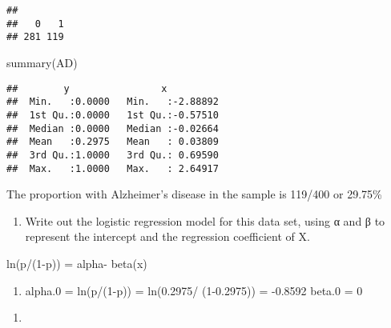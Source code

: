 \documentclass[
]{article}
\newenvironment{Shaded}{\begin{snugshade}}{\end{snugshade}}
\newcommand{\FunctionTok}[1]{\textcolor[rgb]{0.00,0.00,0.00}{#1}}
\newcommand{\NormalTok}[1]{#1}
\providecommand{\tightlist}{%
  \setlength{\itemsep}{0pt}\setlength{\parskip}{0pt}}
\begin{document}
\begin{verbatim}
## 
##   0   1 
## 281 119
\end{verbatim}

\begin{Shaded}
\begin{Highlighting}[]
\FunctionTok{summary}\NormalTok{(AD)}
\end{Highlighting}
\end{Shaded}

\begin{verbatim}
##        y                x           
##  Min.   :0.0000   Min.   :-2.88892  
##  1st Qu.:0.0000   1st Qu.:-0.57510  
##  Median :0.0000   Median :-0.02664  
##  Mean   :0.2975   Mean   : 0.03809  
##  3rd Qu.:1.0000   3rd Qu.: 0.69590  
##  Max.   :1.0000   Max.   : 2.64917
\end{verbatim}

The proportion with Alzheimer's disease in the sample is 119/400 or
29.75\%

\begin{enumerate}
\def\labelenumi{\alph{enumi}.}
\setcounter{enumi}{1}
\tightlist
\item
  Write out the logistic regression model for this data set, using α and
  β to represent the intercept and the regression coefficient of X.
\end{enumerate}

ln(p/(1-p)) = alpha- beta(x)

\begin{enumerate}
\def\labelenumi{\alph{enumi}.}
\setcounter{enumi}{2}
\tightlist
\item
  alpha.0 = ln(p/(1-p)) = ln(0.2975/ (1-0.2975)) = -0.8592 beta.0 = 0
\end{enumerate}

\begin{enumerate}
\def\labelenumi{\roman{enumi})}
\tightlist
\item
\end{enumerate}
\end{document}
